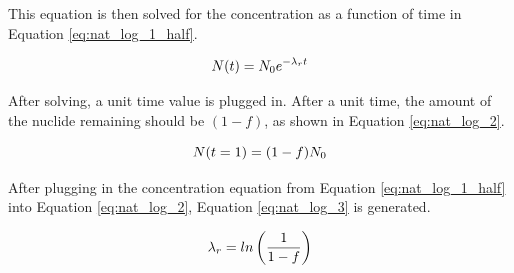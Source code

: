 This equation is then solved for the concentration as a function of time in Equation \eqref{eq:nat_log_1_half}.

\begin{equation} \hfill
N(t) = N_0 e^{-\lambda_r t}
\hfill\label{eq:nat_log_1_half} \end{equation}

After solving, a unit time value is plugged in. After a unit time, the amount of the nuclide remaining should be $(1-f)$, as shown in Equation \eqref{eq:nat_log_2}.

\begin{equation} \hfill
N(t = 1) = (1-f) N_{0}
\hfill\label{eq:nat_log_2} \end{equation}

After plugging in the concentration equation from Equation \eqref{eq:nat_log_1_half} into Equation \eqref{eq:nat_log_2}, Equation \eqref{eq:nat_log_3} is generated.




\begin{equation} \hfill
\lambda_r = ln\left( \frac{1}{1-f} \right)
\hfill\label{eq:nat_log_3} \end{equation}




